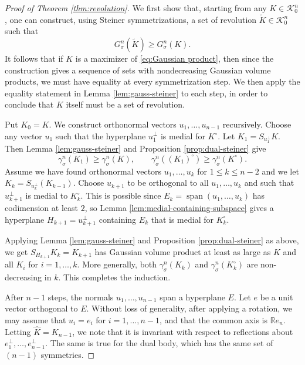 \documentclass[12pt,oneside,reqno]{amsart}
\numberwithin{equation}{section}
\theoremstyle{remark}
\def\class{\mathcal{K}^n_0}
\begin{document}
\begin{proof}[Proof of Theorem \ref{thm:revolution}]
We first show that, starting from any \(K\in\class\), one can construct, using Steiner symmetrizations, a set of revolution \(\widetilde K\in\class\) such that
\[
     G^n_\sigma(\widetilde K)\ge G^n_\sigma(K).
\]
It follows that if $K$ is a maximizer of \eqref{eq:Gaussian product}, then since the construction gives a sequence of sets with nondecreasing Gaussian volume products, we must have equality at every symmetrization step.  We then apply the equality statement in Lemma \ref{lem:gauss-steiner} to each step, in order to conclude that $K$ itself must be a set of revolution. 

Put \(K_0=K\). We construct orthonormal vectors
\(u_1,\ldots,u_{n-1}\) recursively. Choose any vector $u_1$ such that the hyperplane $u_1^\perp$ is medial for $K^\circ$. Let $K_1=S_{u_1^\perp}K$. Then Lemma \ref{lem:gauss-steiner} and Proposition \ref{prop:dual-steiner} give
\[
        \gamma_\sigma^n(K_1)\ge \gamma_\sigma^n(K),
        \qquad
        \gamma_\sigma^n((K_1)^\circ)
        \ge \gamma_\sigma^n(K^\circ).
\]
Assume we have found orthonormal vectors $u_1,\ldots,u_k$ for $1\le k\le n-2$ and we let $K_k=S_{u_k^\perp}(K_{k-1})$. 
Choose $u_{k+1}$ to be orthogonal to all $u_1, \ldots, u_k$ and such that $u_{k+1}^\perp$ is medial to $K_k^\circ$. This is possible since $E_k=\operatorname{span}(u_1,\ldots,u_k)$ has codimension at least $2$, so Lemma \ref{lem:medial-containing-subspace} gives a hyperplane $H_{k+1}=u_{k+1}^\perp$ containing $E_k$ that is medial for $K_k^\circ$.


Applying Lemma \ref{lem:gauss-steiner} and Proposition \ref{prop:dual-steiner} as above, we get $S_{H_{k+1}}K_k=K_{k+1}$ has Gaussian volume product at least as large as $K$ and all $K_i$ for $i=1,\ldots,k$. More generally, both $\gamma^n_\sigma(K_k)$ and $\gamma^n_{\sigma}(K_k^{\circ})$ are non-decreasing in $k$. This completes the induction.

After $n-1$ steps, the normals $u_1,\ldots,u_{n-1}$ span a hyperplane $E$. Let $e$ be a unit vector orthogonal to $E$. Without loss of generality, 
after applying a rotation, we may assume that
\(u_i=e_i\) for \(i=1,\ldots,n-1\), and that the common axis is
\(\mathbb Re_n\). Letting $\hat K=K_{n-1}$, we note that it is invariant with respect to reflections about $e_1^\perp, \ldots, e_{n-1}^\perp$. The same is true for the dual body, which has the same set of \((n-1)\) symmetries.




\end{proof}
\end{document}
